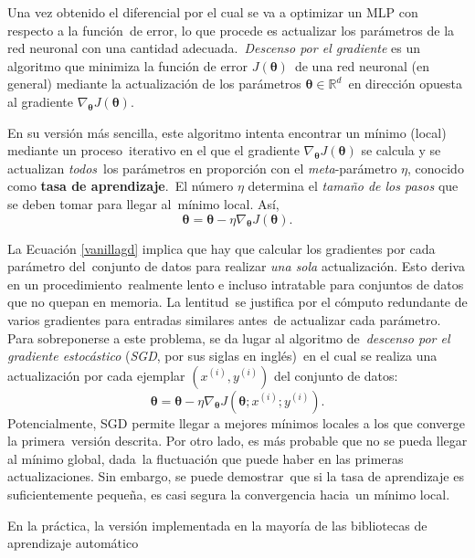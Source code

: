 \noindent
Una vez obtenido el diferencial por el cual se va a optimizar un MLP con respecto a la función\
de error, lo que procede es actualizar los parámetros de la red neuronal con una cantidad adecuada.\
\emph{Descenso por el gradiente} es un algoritmo que minimiza la función de error $J(\bm{\theta})$\
de una red neuronal (en general) mediante la actualización de los parámetros $\bm{\theta} \in \mathbb{R}^d$\
en dirección opuesta al gradiente $\nabla_{\bm{\theta}}J(\bm{\theta})$.\par
En su versión más sencilla, este algoritmo intenta encontrar un mínimo (local) mediante un proceso\
iterativo en el que el gradiente $\nabla_{\bm{\theta}}J(\bm{\theta})$ se calcula y se actualizan \emph{todos}\
los parámetros en proporción con el \emph{meta}-parámetro $\eta$, conocido como \textbf{tasa de aprendizaje}.\
El número $\eta$ determina el \textit{tamaño de los pasos} que se deben tomar para llegar al\
mínimo local. Así,
\begin{equation}
  \bm{\theta} = \bm{\theta} - \eta \nabla_{\bm{\theta}}J(\bm{\theta}). \label{vanillagd}
\end{equation}\par
La Ecuación \ref{vanillagd} implica que hay que calcular los gradientes por cada parámetro del\
conjunto de datos para realizar \emph{una sola} actualización. Esto deriva en un procedimiento\
realmente lento e incluso intratable para conjuntos de datos que no quepan en memoria. La lentitud\
se justifica por el cómputo redundante de varios gradientes para entradas similares antes\
de actualizar cada parámetro. Para sobreponerse a este problema, se da lugar al algoritmo de\
\emph{descenso por el gradiente estocástico} (\emph{SGD}, por sus siglas en inglés)\
en el cual se realiza una actualización por cada ejemplar $(x^{(i)}, y^{(i)})$ del conjunto de datos:
\begin{equation}
  \bm{\theta} = \bm{\theta} - \eta \nabla_{\bm{\theta}}J(\bm{\theta}; x^{(i)}; y^{(i)}). \label{sgd}
\end{equation}
Potencialmente, SGD permite llegar a mejores mínimos locales a los que converge la primera\
versión descrita. Por otro lado, es más probable que no se pueda llegar al mínimo global, dada\
la fluctuación que puede haber en las primeras actualizaciones. Sin embargo, se puede demostrar\
que si la tasa de aprendizaje es suficientemente pequeña, es casi segura la convergencia hacia\
un mínimo local.\par
En la práctica, la versión implementada en la mayoría de las bibliotecas de aprendizaje automático\
